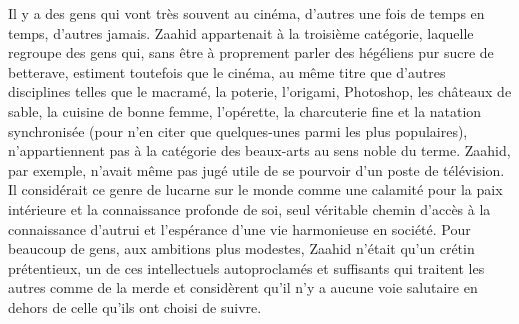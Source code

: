 Il y a des gens qui vont très souvent au cinéma, d’autres une fois de temps en temps, d’autres jamais. Zaahid appartenait à la troisième catégorie, laquelle regroupe des gens qui, sans être à proprement parler des hégéliens pur sucre de betterave, estiment toutefois que le cinéma, au même titre que d’autres disciplines telles que le macramé, la poterie, l’origami, Photoshop, les châteaux de sable, la cuisine de bonne femme, l’opérette, la charcuterie fine et la natation synchronisée (pour n’en citer que quelques-unes parmi les plus populaires), n’appartiennent pas à la catégorie des beaux-arts au sens noble du terme. Zaahid, par exemple, n’avait même pas jugé utile de se pourvoir d’un poste de télévision. Il considérait ce genre de lucarne sur le monde comme une calamité pour la paix intérieure et la connaissance profonde de soi, seul véritable chemin d’accès à la connaissance d’autrui et l’espérance d’une vie harmonieuse en société. Pour beaucoup de gens, aux ambitions plus modestes, Zaahid n’était qu’un crétin prétentieux, un de ces intellectuels autoproclamés et suffisants qui traitent les autres comme de la merde et considèrent qu’il n’y a aucune voie salutaire en dehors de celle qu’ils ont choisi de suivre.

